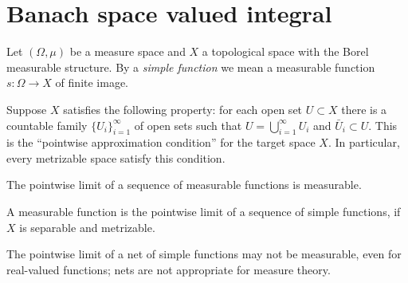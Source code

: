 \documentclass[12pt]{article}
\begin{document}
\section{Banach space valued integral}
\begin{prb}
Let $(\Omega,\mu)$ be a measure space and $X$ a topological space with the Borel measurable structure.
By a \emph{simple function} we mean a measurable function $s:\Omega\to X$ of finite image.

Suppose $X$ satisfies the following property: for each open set $U\subset X$ there is a countable family $\{U_i\}_{i=1}^\infty$ of open sets such that $U=\bigcup_{i=1}^\infty U_i$ and $\bar U_i\subset U$.
This is the ``pointwise approximation condition'' for the target space $X$.
In particular, every metrizable space satisfy this condition.
\begin{parts}
\item The pointwise limit of a sequence of measurable functions is measurable.
\item A measurable function is the pointwise limit of a sequence of simple functions, if $X$ is separable and metrizable.
\item The pointwise limit of a net of simple functions may not be measurable, even for real-valued functions; nets are not appropriate for measure theory.
\end{parts}
\end{prb}
\end{document}

